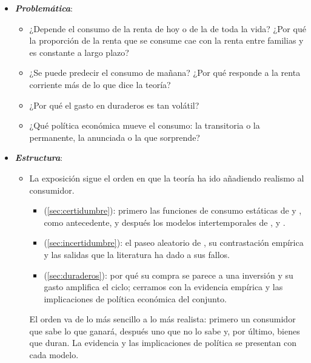 \documentclass[11pt]{article}
\begin{document}
\begin{itemize}
\begin{itemize}
\begin{itemize}
  \item El Premio Nobel de Economía de 2026 ha sido para  y  «por los fundamentos microeconómicos de la estabilización macroeconómica»\nocite{Nobel2026Prensa}: el paseo aleatorio de  es la pieza del consumo de los modelos neokeynesianos que hoy usan los bancos centrales (\ref{sec:hall}).
  \item Los bienes duraderos se estudian aparte porque su compra se parece más a una inversión que a un consumo .
  \end{itemize}
  \end{itemize}

\item \textbf{\emph{Problemática}}:
  \begin{itemize}
  \item ¿Depende el consumo de la renta de hoy o de la de toda la vida? ¿Por qué la proporción de la renta que se consume cae con la renta entre familias y es constante a largo plazo?
  \item ¿Se puede predecir el consumo de mañana? ¿Por qué responde a la renta corriente más de lo que dice la teoría?
  \item ¿Por qué el gasto en duraderos es tan volátil?
  \item ¿Qué política económica mueve el consumo: la transitoria o la permanente, la anunciada o la que sorprende?
  \end{itemize}

\item \textbf{\emph{Estructura}}:
  \begin{itemize}
  \item La exposición sigue el orden en que la teoría ha ido añadiendo realismo al consumidor.
  \begin{itemize}
  \item {} (\ref{sec:certidumbre}): primero las funciones de consumo estáticas de  y , como antecedente, y después los modelos intertemporales de ,  y .
  \item {} (\ref{sec:incertidumbre}): el paseo aleatorio de , su contrastación empírica y las salidas que la literatura ha dado a sus fallos.
  \item {} (\ref{sec:duraderos}): por qué su compra se parece a una inversión y su gasto amplifica el ciclo; cerramos con la evidencia empírica y las implicaciones de política económica del conjunto.
  \end{itemize}
  El orden va de lo más sencillo a lo más realista: primero un consumidor que sabe lo que ganará, después uno que no lo sabe y, por último, bienes que duran. La evidencia y las implicaciones de política se presentan con cada modelo.
  \end{itemize}
\end{itemize}
\end{document}
